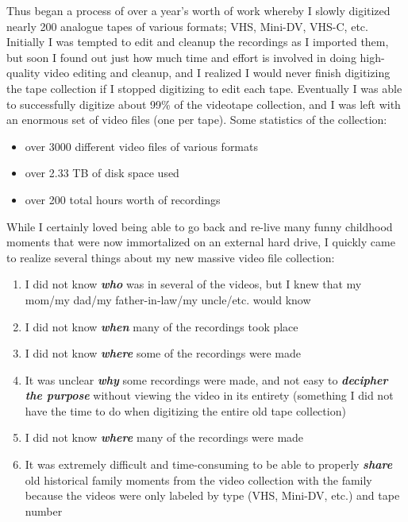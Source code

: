 Thus began a process of over a year's worth of work whereby I slowly digitized nearly 200 analogue tapes of various formats; VHS, Mini-DV, VHS-C, etc.  Initially I was tempted to edit and cleanup the recordings as I imported them, but soon I found out just how much time and effort is involved in doing high-quality video editing and cleanup, and I realized I would never finish digitizing the tape collection if I stopped digitizing to edit each tape.  Eventually I was able to successfully digitize about 99\% of the videotape collection, and I was left with an enormous set of video files (one per tape).  Some statistics of the collection:

\begin{itemize}
\item over 3000 different video files of various formats
\item over 2.33 TB of disk space used
\item over 200 total hours worth of recordings
\end{itemize}

While I certainly loved being able to go back and re-live many funny childhood moments that were now immortalized on an external hard drive, I quickly came to realize several things about my new massive video file collection:

\begin{enumerate}
\item I did not know \textbf{\textit{who}} was in several of the videos, but I knew that my mom/my dad/my father-in-law/my uncle/etc. would know
\item I did not know \textbf{\textit{when}} many of the recordings took place
\item I did not know \textbf{\textit{where}} some of the recordings were made
\item It was unclear \textbf{\textit{why}} some recordings were made, and not easy to \textbf{\textit{decipher the purpose}} without viewing the video in its entirety (something I did not have the time to do when digitizing the entire old tape collection)
\item I did not know \textbf{\textit{where}} many of the recordings were made
\item It was extremely difficult and time-consuming to be able to properly \textbf{\textit{share}} old historical family moments from the video collection with the family because the videos were only labeled by type (VHS, Mini-DV, etc.) and tape number
\end{enumerate}


